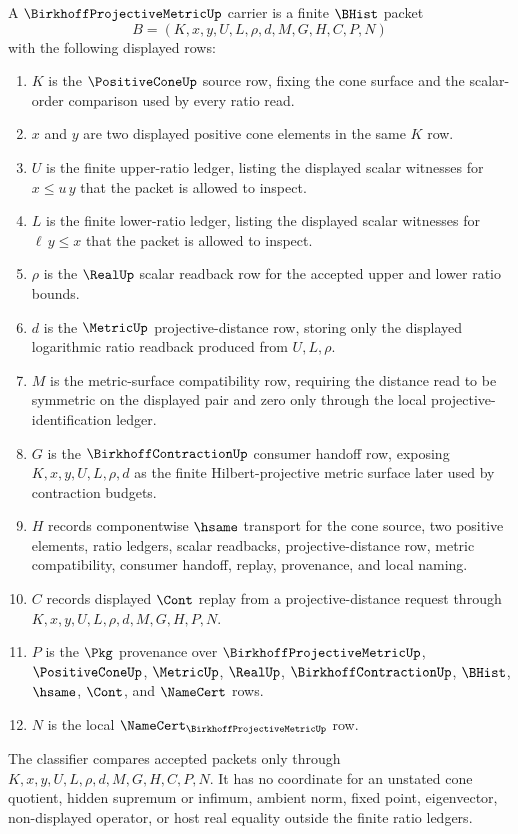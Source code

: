 \begin{definition}\label{def:birkhoff-projective-metric-carrier}
A $\BirkhoffProjectiveMetricUp$ carrier is a finite $\BHist$ packet
$$
B=(K,x,y,U,L,\rho,d,M,G,H,C,P,N)
$$
with the following displayed rows:
\begin{enumerate}
\item $K$ is the $\PositiveConeUp$ source row, fixing the cone surface and the scalar-order comparison used by every ratio read.
\item $x$ and $y$ are two displayed positive cone elements in the same $K$ row.
\item $U$ is the finite upper-ratio ledger, listing the displayed scalar witnesses for $x\leq u\,y$ that the packet is allowed to inspect.
\item $L$ is the finite lower-ratio ledger, listing the displayed scalar witnesses for $\ell\,y\leq x$ that the packet is allowed to inspect.
\item $\rho$ is the $\RealUp$ scalar readback row for the accepted upper and lower ratio bounds.
\item $d$ is the $\MetricUp$ projective-distance row, storing only the displayed logarithmic ratio readback produced from $U,L,\rho$.
\item $M$ is the metric-surface compatibility row, requiring the distance read to be symmetric on the displayed pair and zero only through the local projective-identification ledger.
\item $G$ is the $\BirkhoffContractionUp$ consumer handoff row, exposing $K,x,y,U,L,\rho,d$ as the finite Hilbert-projective metric surface later used by contraction budgets.
\item $H$ records componentwise $\hsame$ transport for the cone source, two positive elements, ratio ledgers, scalar readbacks, projective-distance row, metric compatibility, consumer handoff, replay, provenance, and local naming.
\item $C$ records displayed $\Cont$ replay from a projective-distance request through $K,x,y,U,L,\rho,d,M,G,H,P,N$.
\item $P$ is the $\Pkg$ provenance over $\BirkhoffProjectiveMetricUp$, $\PositiveConeUp$, $\MetricUp$, $\RealUp$, $\BirkhoffContractionUp$, $\BHist$, $\hsame$, $\Cont$, and $\NameCert$ rows.
\item $N$ is the local $\NameCert_{\BirkhoffProjectiveMetricUp}$ row.
\end{enumerate}
The classifier compares accepted packets only through $K,x,y,U,L,\rho,d,M,G,H,C,P,N$. It has no coordinate for an unstated cone quotient, hidden supremum or infimum, ambient norm, fixed point, eigenvector, non-displayed operator, or host real equality outside the finite ratio ledgers.
\end{definition}

